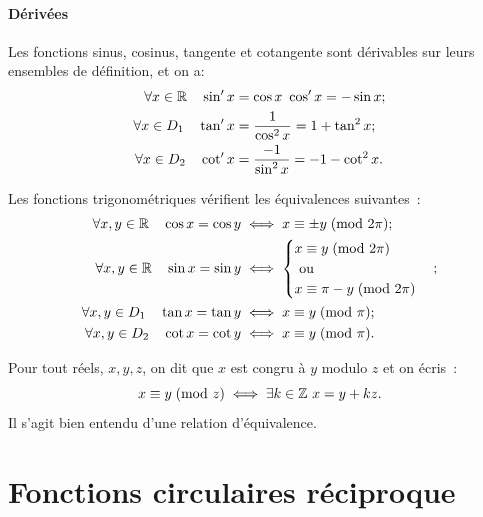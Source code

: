 \paragraph{Dérivées}
Les fonctions sinus, cosinus, tangente et cotangente sont dérivables sur leurs ensembles de définition, et on a:
\begin{align}
    \forall x \in \mathbb{R} \quad \sin'x &=\cos x \ \cos'x=-\sin x; \\
    \forall x \in D_1 \quad \tan'x &=\frac{1}{\cos^2 x}=1+\tan^2 x; \\
    \forall x \in D_2 \quad \cot'x &=\frac{-1}{\sin^2 x}=-1-\cot^2 x.
\end{align}
\begin{prop}
  Les fonctions trigonométriques vérifient les équivalences suivantes~:
  \begin{align}
      \forall x, y \in \mathbb{R} \quad \cos x = \cos y &\iff x \equiv \pm y\!\pmod {2\pi} ;\\
      \forall x, y \in \mathbb{R} \quad \sin x = \sin y &\iff \begin{cases} x \equiv y\!\pmod {2\pi} \\ \text{~ou~} \\ x \equiv \pi-y\!\pmod {2\pi}\end{cases} ; \\
      \forall x, y \in D_1 \quad \tan x = \tan y &\iff x \equiv y\!\pmod {\pi} ;\\
      \forall x, y \in D_2 \quad \cot x = \cot y &\iff x \equiv y\!\pmod {\pi} .
  \end{align}
\end{prop}
\begin{defdef}[Congruence]
Pour tout réels, \(x, y, z\), on dit que \(x\) est congru à \(y\) modulo \(z\) et on écris~:
\begin{equation}
    x \equiv y\!\pmod {z} \iff \exists k \in \mathbb{Z} \ x = y + kz.
\end{equation}
Il s'agit bien entendu d'une relation d'équivalence.
\end{defdef}
\section{Fonctions circulaires réciproque}
\label{sec:chap1-fonctionscircréciproques}
